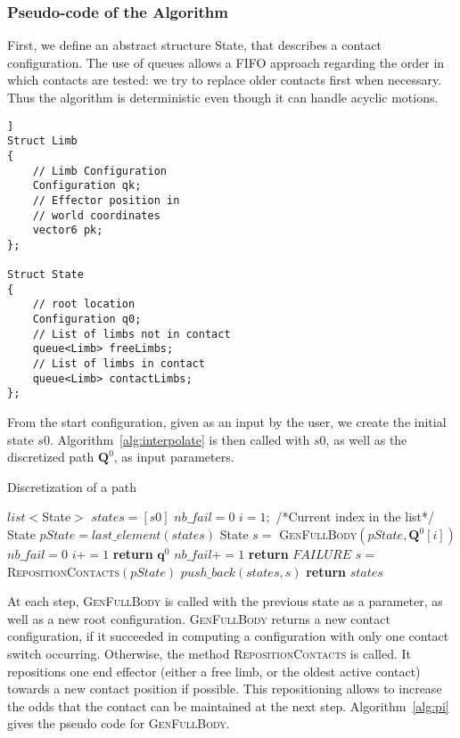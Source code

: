 \subsubsection{Pseudo-code of the Algorithm}
\label{app:contact}


First, we define an abstract structure State,
that describes a contact configuration.
The use of queues allows a FIFO approach regarding the order 
in which contacts are tested: we try to replace older contacts first when necessary.
Thus the algorithm is deterministic even though it can handle acyclic motions. \\

\begin{lstlisting}]
Struct Limb
{
    // Limb Configuration
    Configuration qk;
    // Effector position in
    // world coordinates
    vector6 pk;
};

Struct State
{
    // root location
    Configuration q0;
    // List of limbs not in contact
    queue<Limb> freeLimbs;
    // List of limbs in contact
    queue<Limb> contactLimbs;
};
\end{lstlisting}

From the start configuration, given as an input by the user,
we create the initial state $s0$.
Algorithm~\ref{alg:interpolate}  is then called with $s0$, as well as the discretized path 
$\mathbf{Q}^0$, as input parameters.

\begin{algorithm}
\caption{Discretization of a path} \label{interpolate}
	\begin{algorithmic}[1]
		\State $list<$State$>$ $states = [s0]$
		\State $nb\_fail = 0$ 
		\State $i = 1;$ /*Current index in the list*/
			\State State $pState = last\_element(states)$
			\State State $s =$ \textsc{GenFullBody}$(pState, \mathbf{Q}^0[i])$
				\State $nb\_fail = 0$
				\State $i += 1$
				\State \textbf{return} $\mathbf{q}^{0}$
			\Else
				\State $nb\_fail += 1$
					\State \textbf{return} $FAILURE$
				\EndIf				
				\State $s = $\textsc{RepositionContacts}$(pState)$
			\EndIf
			\State $push\_back(states, s)$
		\EndWhile
		\State \textbf{return} $states$
	\EndFunction
\end{algorithmic}
\label{alg:interpolate}
\end{algorithm}

At each step, \textsc{GenFullBody} is called with the previous state as a parameter, as well
as a new root configuration. \textsc{GenFullBody} returns a new contact configuration, if it succeeded
in computing a configuration with only one contact switch occurring.
Otherwise, the method \textsc{RepositionContacts} is called.
It repositions one end effector (either a free limb, or the oldest active contact) towards a new contact position if possible.
This repositioning allows to increase the odds that the contact can be maintained at the next step.
Algorithm~\ref{alg:pi} gives the pseudo code for \textsc{GenFullBody}.

